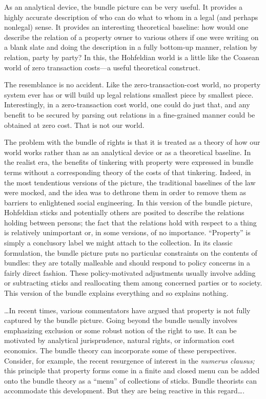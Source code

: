 
As an analytical device, the bundle picture can be very useful. It provides a
highly accurate description of who can do what to whom in a legal (and perhaps
nonlegal) sense. It provides an interesting theoretical baseline: how would one
describe the relation of a property owner to various others if one were writing
on a blank slate and doing the description in a fully bottom-up manner,
relation by relation, party by party? In this, the Hohfeldian world is a little
like the Coasean world of zero transaction costs---a useful theoretical
construct.

The resemblance is no accident. Like the zero-transaction-cost world, no
property system ever has or will build up legal relations smallest piece by
smallest piece. Interestingly, in a zero-transaction cost world, one could do
just that, and any benefit to be secured by parsing out relations in a
fine-grained manner could be obtained at zero cost. That is not our world.

The problem with the bundle of rights is that it is treated as a theory of how
our world works rather than as an analytical device or as a theoretical
baseline. In the realist era, the benefits of tinkering with property were
expressed in bundle terms without a corresponding theory of the costs of that
tinkering. Indeed, in the most tendentious versions of the picture, the
traditional baselines of the law were mocked, and the idea was to dethrone them
in order to remove them as barriers to enlightened social engineering. In this
version of the bundle picture, Hohfeldian sticks and potentially others are
posited to describe the relations holding between persons; the fact that the
relations hold with respect to a thing is relatively unimportant or, in some
versions, of no importance. ``Property'' is simply a conclusory label we might
attach to the collection. In its classic formulation, the bundle picture puts
no particular constraints on the contents of bundles: they are totally
malleable and should respond to policy concerns in a fairly direct fashion.
These policy-motivated adjustments usually involve adding or subtracting sticks
and reallocating them among concerned parties or to society. This version of
the bundle explains everything and so explains nothing.

\ldots In recent times, various commentators have argued that property is not
fully captured by the bundle picture. Going beyond the bundle usually involves
emphasizing exclusion or some robust notion of the right to use. It can be
motivated by analytical jurisprudence, natural rights, or information cost
economics. The bundle theory can incorporate some of these perspectives.
Consider, for example, the recent resurgence of interest in the \textit{numerus
clausus;} this principle that property forms come in a finite and closed menu
can be added onto the bundle theory as a ``menu'' of collections of sticks.
Bundle theorists can accommodate this development. But they are being reactive
in this regard\ldots .

